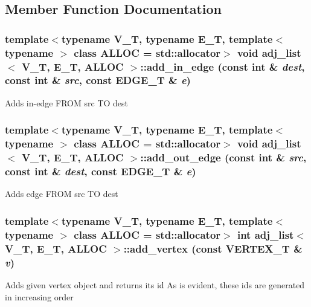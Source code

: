 \subsection{Member Function Documentation}
\subsubsection{\setlength{\rightskip}{0pt plus 5cm}template$<$typename V\_\-T, typename E\_\-T, template$<$ typename $>$ class ALLOC = std::allocator$>$ void \bf{adj\_\-list}$<$ V\_\-T, E\_\-T, ALLOC $>$::add\_\-in\_\-edge (const int \& {\em dest}, const int \& {\em src}, const EDGE\_\-T \& {\em e})\hspace{0.3cm}{\tt  [inline]}}\label{classadj__list_50e4107e17017be140845c56adf779a5}


Adds in-edge FROM src TO dest 
\subsubsection{\setlength{\rightskip}{0pt plus 5cm}template$<$typename V\_\-T, typename E\_\-T, template$<$ typename $>$ class ALLOC = std::allocator$>$ void \bf{adj\_\-list}$<$ V\_\-T, E\_\-T, ALLOC $>$::add\_\-out\_\-edge (const int \& {\em src}, const int \& {\em dest}, const EDGE\_\-T \& {\em e})\hspace{0.3cm}{\tt  [inline]}}\label{classadj__list_62991c5d013874bf3b214557b35b3a41}


Adds edge FROM src TO dest 
\subsubsection{\setlength{\rightskip}{0pt plus 5cm}template$<$typename V\_\-T, typename E\_\-T, template$<$ typename $>$ class ALLOC = std::allocator$>$ int \bf{adj\_\-list}$<$ V\_\-T, E\_\-T, ALLOC $>$::add\_\-vertex (const VERTEX\_\-T \& {\em v})\hspace{0.3cm}{\tt  [inline]}}\label{classadj__list_a15c0364f96c84fdeed7338733678be1}


Adds given vertex object and returns its id As is evident, these ids are generated in increasing order 
